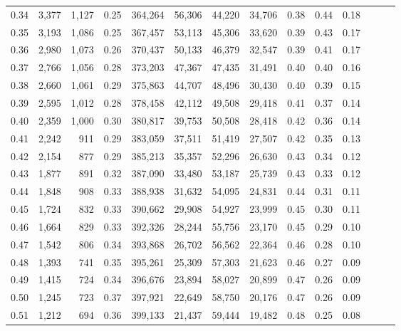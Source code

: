 \begin{tabular}{rrrrrrrrrrrrrr}
0.34 &   3,377 &  1,127 &  0.25 &  364,264 &   56,306 &  44,220 &  34,706 &  0.38 &  0.44 &      0.18 \\
0.35 &   3,193 &  1,086 &  0.25 &  367,457 &   53,113 &  45,306 &  33,620 &  0.39 &  0.43 &      0.17 \\
0.36 &   2,980 &  1,073 &  0.26 &  370,437 &   50,133 &  46,379 &  32,547 &  0.39 &  0.41 &      0.17 \\
0.37 &   2,766 &  1,056 &  0.28 &  373,203 &   47,367 &  47,435 &  31,491 &  0.40 &  0.40 &      0.16 \\
0.38 &   2,660 &  1,061 &  0.29 &  375,863 &   44,707 &  48,496 &  30,430 &  0.40 &  0.39 &      0.15 \\
0.39 &   2,595 &  1,012 &  0.28 &  378,458 &   42,112 &  49,508 &  29,418 &  0.41 &  0.37 &      0.14 \\
0.40 &   2,359 &  1,000 &  0.30 &  380,817 &   39,753 &  50,508 &  28,418 &  0.42 &  0.36 &      0.14 \\
0.41 &   2,242 &    911 &  0.29 &  383,059 &   37,511 &  51,419 &  27,507 &  0.42 &  0.35 &      0.13 \\
0.42 &   2,154 &    877 &  0.29 &  385,213 &   35,357 &  52,296 &  26,630 &  0.43 &  0.34 &      0.12 \\
0.43 &   1,877 &    891 &  0.32 &  387,090 &   33,480 &  53,187 &  25,739 &  0.43 &  0.33 &      0.12 \\
0.44 &   1,848 &    908 &  0.33 &  388,938 &   31,632 &  54,095 &  24,831 &  0.44 &  0.31 &      0.11 \\
0.45 &   1,724 &    832 &  0.33 &  390,662 &   29,908 &  54,927 &  23,999 &  0.45 &  0.30 &      0.11 \\
0.46 &   1,664 &    829 &  0.33 &  392,326 &   28,244 &  55,756 &  23,170 &  0.45 &  0.29 &      0.10 \\
0.47 &   1,542 &    806 &  0.34 &  393,868 &   26,702 &  56,562 &  22,364 &  0.46 &  0.28 &      0.10 \\
0.48 &   1,393 &    741 &  0.35 &  395,261 &   25,309 &  57,303 &  21,623 &  0.46 &  0.27 &      0.09 \\
0.49 &   1,415 &    724 &  0.34 &  396,676 &   23,894 &  58,027 &  20,899 &  0.47 &  0.26 &      0.09 \\
0.50 &   1,245 &    723 &  0.37 &  397,921 &   22,649 &  58,750 &  20,176 &  0.47 &  0.26 &      0.09 \\
0.51 &   1,212 &    694 &  0.36 &  399,133 &   21,437 &  59,444 &  19,482 &  0.48 &  0.25 &      0.08 \\

\end{tabular}

